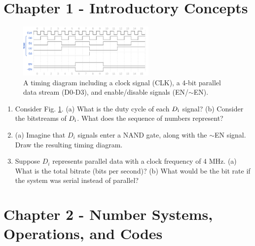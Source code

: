 \documentclass[10pt]{article}
\begin{document}
\maketitle

\section{Chapter 1 - Introductory Concepts}
\begin{figure}[ht]
\centering
\includegraphics[width=0.6\textwidth]{timingExample6.pdf}
\caption{\label{fig:timing1} A timing diagram including a clock signal (CLK), a 4-bit parallel data stream (D0-D3), and enable/disable signals (EN/$\sim$EN).}
\end{figure}
\begin{enumerate}
\item Consider Fig. \ref{fig:timing1}. (a) What is the duty cycle of each $D_{\rm i}$ signal? (b) Consider the bitstreams of $D_{\rm i}$.  What does the sequence of numbers represent? \\ \vspace{1.0cm}
\item (a) Imagine that $D_i$ signals enter a NAND gate, along with the $\sim$EN signal.  Draw the resulting timing diagram. \\ \vspace{1.5cm}
\item Suppose $D_i$ represents parallel data with a clock frequency of 4 MHz.  (a) What is the total bitrate (bits per second)?  (b) What would be the bit rate if the system was serial instead of parallel? \\ \vspace{1cm}
\end{enumerate}

\section{Chapter 2 - Number Systems, Operations, and Codes}
\end{document}

